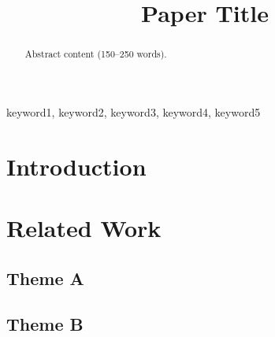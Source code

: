 \documentclass[conference]{IEEEtran}
\begin{document}
\title{Paper Title}

\author{
}

\maketitle

\begin{abstract}
Abstract content (150--250 words).
\end{abstract}

\begin{IEEEkeywords}
keyword1, keyword2, keyword3, keyword4, keyword5
\end{IEEEkeywords}

\section{Introduction}


\section{Related Work}

\subsection{Theme A}
\subsection{Theme B}
\end{document}
